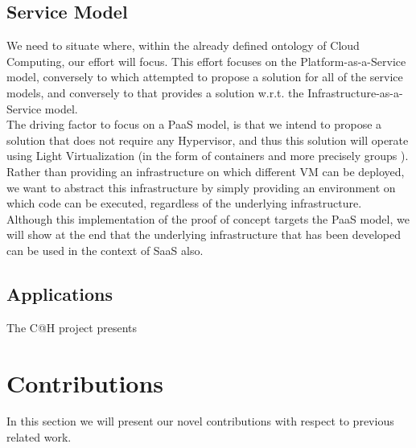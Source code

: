 \documentclass[11pt]{amsart}
\begin{document}
	\subsection{Service Model}
	We need to situate where, within the already defined ontology of Cloud Computing, our effort will 
	focus. This effort focuses on the Platform-as-a-Service model, conversely to \cite{cathome}
	which attempted to propose a solution for all of the service models, and conversely to \cite{P2PCS} 
	that provides a solution w.r.t. the Infrastructure-as-a-Service model.
	\\
	The driving factor to focus on a PaaS model, is that we intend to propose a solution that does not 
	require any Hypervisor, and thus this solution will operate using Light Virtualization (in the form 
	of containers and more precisely groups \cite{cgroups}). Rather than providing an infrastructure on 
	which different VM can be deployed, we want to abstract this infrastructure by simply providing an 
	environment on which code can be executed, regardless of the underlying infrastructure.
	\\
	Although this implementation of the proof of concept targets the PaaS model, we will show at the end 
	that the underlying infrastructure that has been developed can be used in the context of SaaS also.
	
	\subsection{Applications}
	The C@H project presents 
	
	\section{Contributions}
	In this section we will present our novel contributions with respect to previous related work.
	
\end{document}
